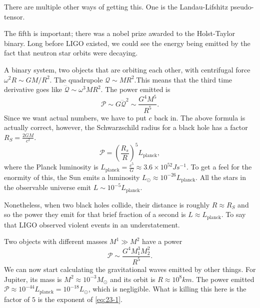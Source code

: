 \begin{remark}
  There are multiple other ways of getting this. One is the Landau-Lifshitz pseudo-tensor.
\end{remark}

\begin{remark}
  The fifth is important; there was a nobel prize awarded to the Holst-Taylor binary.
  Long before LIGO existed, we could see the energy being emitted by the fact that neutron star orbits were decaying.
\end{remark}

\begin{example}[]
  A binary system, two objects that are orbiting each other, with centrifugal force $\omega^2 R \sim GM / R^2$.
  The quadrupole $\mathcal{Q} \sim M R^2$.This means that the third time derivative goes like $\dddot{\mathcal{Q}} \sim \omega^3 M R^2$. The power emitted is
  \begin{equation}
    \mathcal{P} \sim G \dddot{\mathcal{Q}}^2 \sim \frac{G^4M^5}{R^5}.
  \end{equation}
  Since we want actual numbers, we have to put $c$ back in. The above formula is actually correct, however, the Schwarzschild radius for a black hole has a factor $R_S = \frac{2GM}{c^2}$. 
  \begin{equation}
    \label{eq:23-1}
    \mathcal{P} = \left(\frac{R_s}{R}\right)^5 L_{\text{planck}},
  \end{equation}
  where the Planck luminosity is $L_{\text{planck}} = \frac{c^5}{G} \approx 3.6 \times 10^{52} Js^{-1}$.
 To get a feel for the enormity of this, the Sun emits a luminosity $L_\odot \approx 10^{-26} L_{\text{planck}}$.
 All the stars in the observable universe emit $L \sim 10^{-5} L_{\text{planck}}$.

  Nonetheless, when two black holes collide, their distance is roughly $R \approx R_S$ and so the power they emit for that brief fraction of a second is $L \approx L_{\text{planck}}$. To say that LIGO observed violent events in an understatement.
\end{example}

\begin{example}[]
  Two objects with different masses $M^1 \gg M^2$ have a power
  \begin{equation}
    \mathcal{P} \sim \frac{G^4 M_1^3 M_2^2}{R^5}.
  \end{equation}
  We can now start calculating the gravitational waves emitted by other things.
  For Jupiter, its mass is $M^2 \approx 10^{-3} M_\odot$ and its orbit is $R\approx 10^8 km$.
  The power emitted $\mathcal{P} \approx 10^{-44} L_{\text{planck}} = 10^{-18} L_\odot$, which is negligible. What is killing this here is the factor of $5$ is the exponent of \eqref{eq:23-1}.
\end{example}

